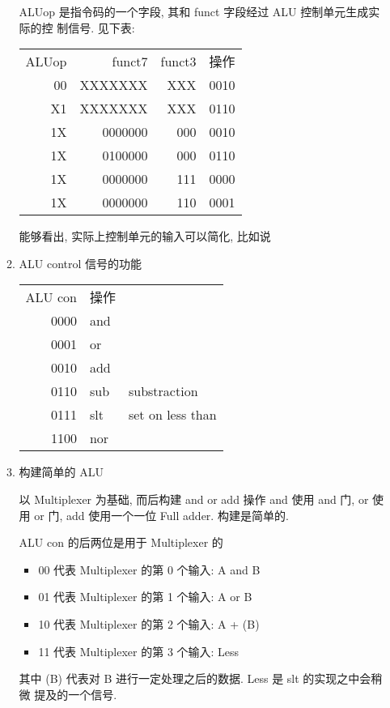 \documentclass[11pt]{ctexart}
\begin{document}
\begin{enumerate}
\begin{enumerate}
ALUop 是指令码的一个字段, 其和 funct 字段经过 ALU 控制单元生成实际的控
制信号. 见下表:

\begin{center}
\begin{tabular}{rrrr}
ALUop & funct7 & funct3 & 操作\\
00 & XXXXXXX & XXX & 0010\\
X1 & XXXXXXX & XXX & 0110\\
1X & 0000000 & 000 & 0010\\
1X & 0100000 & 000 & 0110\\
1X & 0000000 & 111 & 0000\\
1X & 0000000 & 110 & 0001\\
\end{tabular}
\end{center}

能够看出, 实际上控制单元的输入可以简化, 比如说
\item ALU control 信号的功能
\label{sec:org100c710}

\begin{center}
\begin{tabular}{rll}
ALU con & 操作 & \\
0000 & and & \\
0001 & or & \\
0010 & add & \\
0110 & sub & substraction\\
0111 & slt & set on less than\\
1100 & nor & \\
\end{tabular}
\end{center}

\item 构建简单的 ALU
\label{sec:org2c8ecce}

以 Multiplexer 为基础, 而后构建 and or add 操作
and 使用 and 门, or 使用 or 门, add 使用一个一位 Full adder. 
构建是简单的.

ALU con 的后两位是用于 Multiplexer 的
\begin{itemize}
\item 00 代表 Multiplexer 的第 0 个输入: A and B
\item 01 代表 Multiplexer 的第 1 个输入: A or  B
\item 10 代表 Multiplexer 的第 2 个输入: A + (B)
\item 11 代表 Multiplexer 的第 3 个输入: Less
\end{itemize}

其中 (B) 代表对 B 进行一定处理之后的数据. Less 是 slt 的实现之中会稍微
提及的一个信号. 


\end{enumerate}
\end{enumerate}
\end{document}
